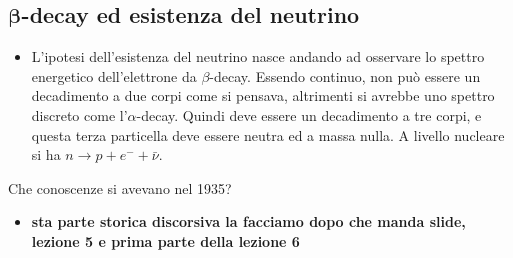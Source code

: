 \subsection[\texorpdfstring{$\beta$}{\textbeta}-decay ed esistenza del neutrino]
{$\boldsymbol{\beta}$-decay ed esistenza del neutrino}
\begin{itemize}
    \item L'ipotesi dell'esistenza del neutrino nasce andando ad osservare lo spettro energetico dell'elettrone da $\beta$-decay. Essendo continuo, non può essere un decadimento a due corpi come si pensava, altrimenti si avrebbe uno spettro discreto come l'$\alpha$-decay. Quindi deve essere un decadimento a tre corpi, e questa terza particella deve essere neutra ed a massa nulla. A livello nucleare si ha $n\to p+e^-+\bar{\nu}$. 
\end{itemize}
Che conoscenze si avevano nel 1935?
\begin{itemize}
    \item \textbf{sta parte storica discorsiva la facciamo dopo che manda slide, lezione 5 e prima parte della lezione 6}
\end{itemize}
